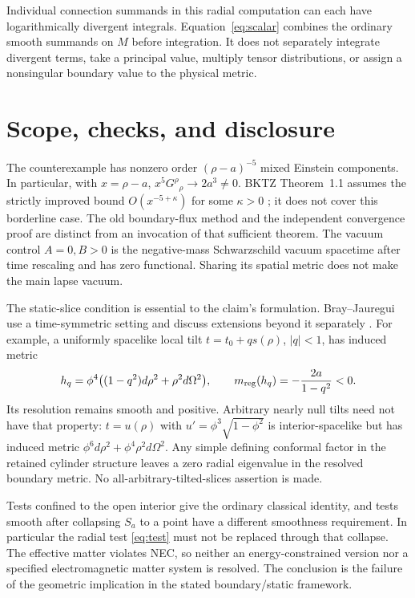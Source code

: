 \documentclass[11pt]{article}
\begin{document}
Individual connection summands in this radial computation can each have
logarithmically divergent integrals. Equation~\eqref{eq:scalar} combines
the ordinary smooth summands on $M$ before integration. It does not
separately integrate divergent terms, take a principal value, multiply
tensor distributions, or assign a nonsingular boundary value to the
physical metric.

\section{Scope, checks, and disclosure}

The counterexample has nonzero order $(\rho-a)^{-5}$ mixed Einstein
components. In particular, with $x=\rho-a$,
$x^5G^\rho{}_\rho\to2a^3\ne0$. BKTZ Theorem~1.1 assumes the strictly
improved bound $O(x^{-5+\kappa})$ for some $\kappa>0$ \cite{BKTZ}; it does
not cover this borderline case. The old boundary-flux method and the
independent convergence proof are distinct from an invocation of that
sufficient theorem. The vacuum control $A=0,B>0$ is the negative-mass
Schwarzschild vacuum spacetime after time rescaling and has zero functional.
Sharing its spatial metric does not make the main lapse vacuum.

The static-slice condition is essential to the claim's formulation.
Bray--Jauregui use a time-symmetric setting and discuss extensions beyond
it separately \cite[p.~3 and Section~6.6 of the arXiv version]{BJ}. For
example, a uniformly spacelike local tilt $t=t_0+q s(\rho)$, $|q|<1$, has
induced metric
\[
 h_q=\phi^4\bigl((1-q^2)d\rho^2+\rho^2d\Omega^2\bigr),
 \qquad m_{\rm reg}(h_q)=-\frac{2a}{1-q^2}<0.
\]
Its resolution remains smooth and positive. Arbitrary nearly null tilts
need not have that property: $t=u(\rho)$ with
$u'=\phi^3\sqrt{1-\phi^2}$ is interior-spacelike but has induced metric
$\phi^6d\rho^2+\phi^4\rho^2d\Omega^2$. Any simple defining conformal factor
in the retained cylinder structure leaves a zero radial eigenvalue in the
resolved boundary metric. No all-arbitrary-tilted-slices assertion is made.

Tests confined to the open interior give the ordinary classical identity,
and tests smooth after collapsing $S_a$ to a point have a different
smoothness requirement. In particular the radial test \eqref{eq:test}
must not be replaced through that collapse. The effective matter violates
NEC, so neither an energy-constrained version nor a specified electromagnetic
matter system is resolved. The conclusion is the failure of the geometric
implication in the stated boundary/static framework.
\end{document}
